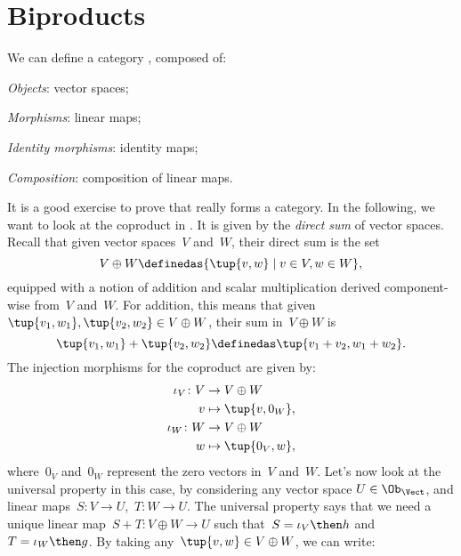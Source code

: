 \section{Biproducts}






\begin{example}
  We can define a category \iindex{\Vect}, composed of:
  \begin{compactitem}
    \item \emph{Objects}: vector spaces;
    \item \emph{Morphisms}: linear maps;
    \item \emph{Identity morphisms}: identity maps;
    \item \emph{Composition}: composition of linear maps.
  \end{compactitem}
  It is a good exercise to prove that \Vect really forms a category. In the following, we want to look at the coproduct in \Vect. It is given by the \emph{direct sum} of vector spaces. Recall that given vector spaces~$V$ and~$W$, their direct sum is the set
  \begin{equation*}
    V\oplus W\definedas \{\tup{v,w}\mid v\in V,w\in W\},
  \end{equation*}
  equipped with a notion of addition and scalar multiplication derived component-wise from~$V$ and~$W$. For addition, this means that given~$\tup{v_1,w_1},\tup{v_2,w_2}\in V\oplus W$, their sum in~$V \oplus W$ is
  \begin{equation*}
    \tup{v_1,w_1}+\tup{v_2,w_2}\definedas \tup{v_1+v_2,w_1+w_2}.
  \end{equation*}
  The injection morphisms for the coproduct are given by:
  \begin{equation*}
    \begin{aligned}
      \iota_V \colon V&\to V\oplus W\\
      v&\mapsto \tup{v,0_W},\\
      \iota_W \colon W&\to V\oplus W\\
      w&\mapsto \tup{0_V,w},
    \end{aligned}
  \end{equation*}
  where~$0_V$ and~$0_W$ represent the zero vectors in~$V$ and~$W$. Let's now look at the universal property in this case, by considering any vector space $U\in \Ob_\Vect$, and linear maps~$S\colon V\to U$,~$T\colon W\to U$. The universal property says that we need a unique linear map~$S+T\colon V\oplus W \to U$ such that~$S=\iota_V\then h$ and~$T=\iota_W\then g$. By taking any~$\tup{v,w}\in V\oplus W$, we can write:

\end{example}
